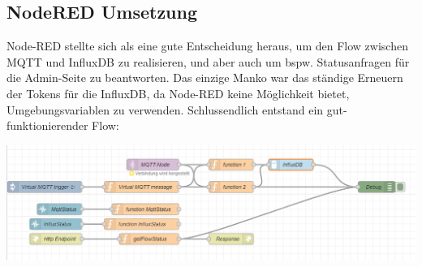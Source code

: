 \subsection{NodeRED Umsetzung}
Node-RED stellte sich als eine gute Entscheidung heraus, um den Flow zwischen MQTT und InfluxDB zu realisieren, und aber auch um bspw. Statusanfragen für die Admin-Seite zu beantworten.
Das einzige Manko war das ständige Erneuern der Tokens für die InfluxDB, da Node-RED keine Möglichkeit bietet, Umgebungsvariablen zu verwenden.
Schlussendlich entstand ein gut-funktionierender Flow:
\begin{center}
  \includegraphics[width=1\textwidth]{../images/UI/flow.png}
\end{center}